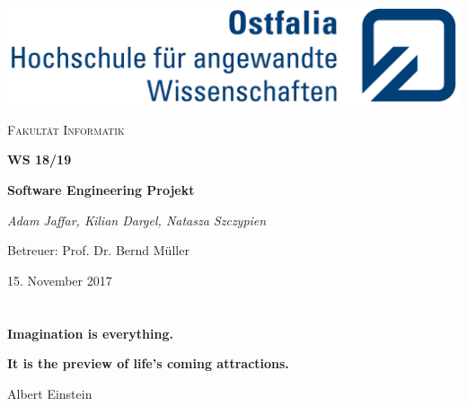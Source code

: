 \documentclass[a4paper,11pt,oneside]{book}
\author{Natasza Szczypien}
\date{12. Januar 2016}
\begin{document}
\fancyhead[L]{}
\renewcommand{\headrulewidth}{0.4pt} %
\fancyfoot[C]{\thepage} %
\renewcommand{\footrulewidth}{0.4pt} %
\renewcommand{\nomname}{Nomenklatur}


\begin{titlepage}

\vspace*{-4.0cm}
\hspace*{5.90cm}\includegraphics[scale=0.93]{img/Ostfalia_LS_RGB_klein.jpg}\\
\centering

	\vspace{2cm}
	
	{\scshape\Large Fakultät Informatik\par}
		\vspace{2cm}
	{\scshape\LARGE \textbf{WS 18/19}\par}
	\vspace{1cm}
	{\huge\bfseries Software Engineering Projekt\par}
	\vspace{1cm}
	{\Large\itshape  Adam Jaffar, Kilian Dargel, Natasza Szczypien\par}
	\vfill
\begin{flushleft}
{\large 
	 Betreuer: Prof. Dr. Bernd Müller \par
}
\end{flushleft}
	

\vspace{2cm}
\centering
{\large 15. November 2017\par}

\end{titlepage}
\frontmatter


\section*{ }
\vspace{10cm}
\begin{center}
{\Large \textbf{Imagination is everything.}\par \textbf{It is the preview of life's coming attractions.}}
\end{center} 
 \begin{flushright}
 Albert Einstein
 \end{flushright}
 \newpage
\end{document}
